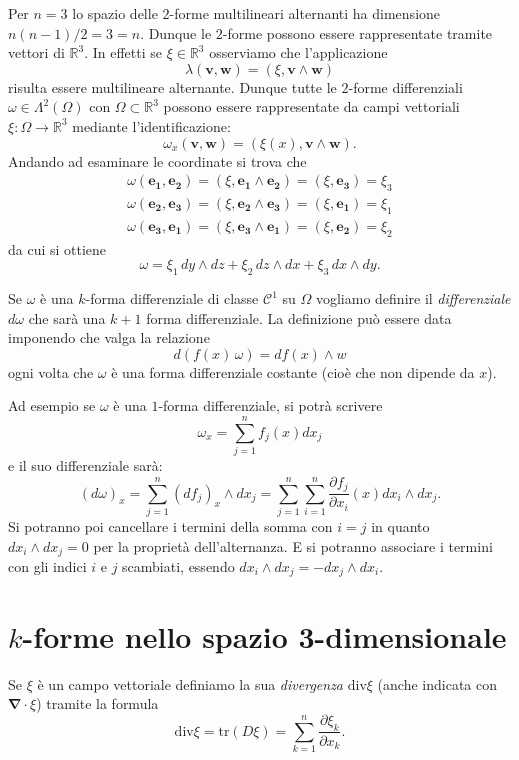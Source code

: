 \documentclass[italian,a4paper]{scrartcl}
\newcommand{\RR}{{\mathbb R}}
\renewcommand{\vec}{\mathbf}
\renewcommand{\div}{\mathrm{div}}
\newcommand{\vecnabla}{\mathbf{\nabla}}
\newcommand{\tr}{\mathrm{tr}}
\begin{document}
\begin{example}
Per $n=3$ lo spazio delle $2$-forme multilineari
alternanti ha dimensione
$n(n-1)/2=3=n$. Dunque le $2$-forme possono essere rappresentate
tramite vettori di $\RR^3$. In effetti se $\xi\in \RR^3$ osserviamo
che l'applicazione
\[
  \lambda(\vec v,\vec w) = (\xi, \vec v\wedge \vec w) 
\]
risulta essere multilineare alternante. Dunque tutte le $2$-forme
differenziali $\omega \in \Lambda^2(\Omega)$ con $\Omega\subset \RR^3$
possono essere rappresentate da campi vettoriali $\xi\colon \Omega\to
\RR^3$ mediante l'identificazione:
\[
  \omega_x(\vec v, \vec w) = (\xi(x),\vec v \wedge \vec w).
\]
Andando ad esaminare le coordinate si trova che
\begin{align*}
  \omega(\vec{e_1},\vec{e_2}) = (\xi, \vec{e_1}\wedge\vec{e_2}) =
  (\xi,\vec{e_3}) = \xi_3\\
  \omega(\vec{e_2},\vec{e_3}) = (\xi, \vec{e_2}\wedge\vec{e_3}) =
  (\xi,\vec{e_1}) = \xi_1\\
  \omega(\vec{e_3},\vec{e_1}) = (\xi, \vec{e_3}\wedge\vec{e_1}) =
  (\xi,\vec{e_2}) = \xi_2
\end{align*}
da cui si ottiene
\[
 \omega = \xi_1\, dy\wedge dz + \xi_2\, dz\wedge dx + \xi_3\,
 dx\wedge dy.
\]
\end{example}


Se $\omega$ è una $k$-forma differenziale di classe $\mathcal C^1$ su
$\Omega$ vogliamo definire il \emph{differenziale} $d\omega$ che sarà
una $k+1$ forma differenziale. La definizione può essere data
imponendo che valga la relazione
\[
  d(f(x)\, \omega) = df(x) \wedge w
\]
ogni volta che $\omega$ è una forma differenziale costante (cioè che
non dipende da $x$).


Ad esempio se $\omega$ è una $1$-forma differenziale, si potrà
scrivere
\[
  \omega_x = \sum_{j=1}^n f_j(x) dx_j
\]
e il suo differenziale sarà:
\[
  (d\omega)_x = \sum_{j=1}^n (df_j)_x \wedge dx_j
  =\sum_{j=1}^n \sum_{i=1}^n \frac{\partial f_j}{\partial x_i}(x) dx_i
  \wedge dx_j.
\]
Si potranno poi cancellare i termini della somma con $i=j$ in quanto
$dx_i\wedge dx_j=0$ per la proprietà dell'alternanza. E si potranno
associare i termini con gli indici $i$ e $j$ scambiati, essendo $dx_i
\wedge dx_j = - dx_j \wedge dx_i$.

\section{$k$-forme nello spazio 3-dimensionale}

Se $\xi$ è un campo vettoriale definiamo la sua \emph{divergenza}
$\div \xi$ (anche indicata con $\vecnabla \cdot \xi$) tramite la formula
\[
  \div \xi = \tr( D\xi) = \sum_{k=1}^n \frac{\partial \xi_k}{\partial x_k}.
\]
\end{document}

